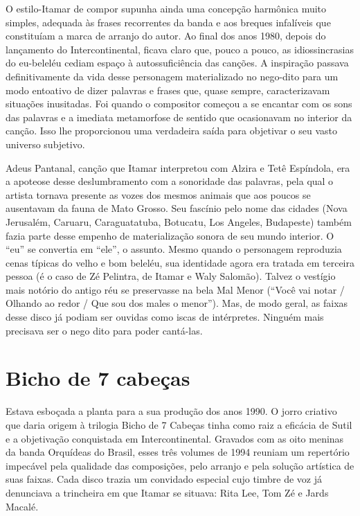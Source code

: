 O estilo-Itamar de compor supunha ainda uma concepção harmônica muito
simples, adequada às frases recorrentes da banda e aos breques
infalíveis que constituíam a marca de arranjo do autor. Ao final dos
anos 1980, depois do lançamento do Intercontinental, ficava claro que,
pouco a pouco, as idiossincrasias do eu-beleléu cediam espaço à
autossuficiência das canções. A inspiração passava definitivamente da
vida desse personagem materializado no nego-dito para um modo entoativo
de dizer palavras e frases que, quase sempre, caracterizavam situações
inusitadas. Foi quando o compositor começou a se encantar com os sons
das palavras e a imediata metamorfose de sentido que ocasionavam no
interior da canção. Isso lhe proporcionou uma verdadeira saída para
objetivar o seu vasto universo subjetivo.

Adeus Pantanal, canção que Itamar interpretou com Alzira e Tetê
Espíndola, era a apoteose desse deslumbramento com a sonoridade das
palavras, pela qual o artista tornava presente as vozes dos mesmos
animais que aos poucos se ausentavam da fauna de Mato Grosso. Seu
fascínio pelo nome das cidades (Nova Jerusalém, Caruaru, Caraguatatuba,
Botucatu, Los Angeles, Budapeste) também fazia parte desse empenho de
materialização sonora de seu mundo interior. O ``eu'' se convertia em
``ele'', o assunto. Mesmo quando o personagem reproduzia cenas típicas
do velho e bom beleléu, sua identidade agora era tratada em terceira
pessoa (é o caso de Zé Pelintra, de Itamar e Waly Salomão). Talvez o
vestígio mais notório do antigo réu se preservasse na bela Mal Menor
(``Você vai notar / Olhando ao redor / Que sou dos males o menor'').
Mas, de modo geral, as faixas desse disco já podiam ser ouvidas como
iscas de intérpretes. Ninguém mais precisava ser o nego dito para poder
cantá-las.

\section{Bicho de 7 cabeças}

Estava esboçada a planta para a sua produção dos anos 1990. O jorro
criativo que daria origem à trilogia Bicho de 7 Cabeças tinha como raiz
a eficácia de Sutil e a objetivação conquistada em Intercontinental.
Gravados com as oito meninas da banda Orquídeas do Brasil, esses três
volumes de 1994 reuniam um repertório impecável pela qualidade das
composições, pelo arranjo e pela solução artística de suas faixas. Cada
disco trazia um convidado especial cujo timbre de voz já denunciava a
trincheira em que Itamar se situava: Rita Lee, Tom Zé e Jards Macalé.

